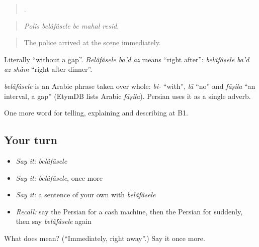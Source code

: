 \begin{quote}
    .
\end{quote}

\begin{quote}
\emph{Polis belâfâsele be mahal resid.}
\end{quote}

\begin{quote}
The police arrived at the scene immediately.
\end{quote}

Literally \textquotedblleft{}without a gap\textquotedblright{}. \emph{Belâfâsele ba'd az} means \textquotedblleft{}right after\textquotedblright{}: \emph{belâfâsele ba'd az shâm} \textquotedblleft{}right after dinner\textquotedblright{}.

\begin{cousinweb}
\emph{belâfâsele} is an Arabic phrase taken over whole: \emph{bi-} \textquotedblleft{}with\textquotedblright{}, \emph{lā} \textquotedblleft{}no\textquotedblright{} and \emph{fāṣila} \textquotedblleft{}an interval, a gap\textquotedblright{} (EtymDB lists Arabic \emph{fāṣila}). Persian uses it as a single adverb.
\end{cousinweb}

\begin{grammarlens}[title={What you've built}]
One more word for telling, explaining and describing at B1.
\end{grammarlens}

\subsection*{Your turn}
\begin{itemize}
\raggedright
  \item \emph{Say it:} \emph{belâfâsele}
  \item \emph{Say it:} \emph{belâfâsele}, once more
  \item \emph{Say it:} a sentence of your own with \emph{belâfâsele}
  \item \emph{Recall:} say the Persian for a cash machine, then the Persian for suddenly, then say \emph{belâfâsele} again
\end{itemize}

\begin{tcolorbox}[breakable,colback=teal!4,colframe=teal!35!black,title={Before you move on}]
What does  mean? (\textquotedblleft{}Immediately, right away\textquotedblright{}.) Say it once more.
\end{tcolorbox}
